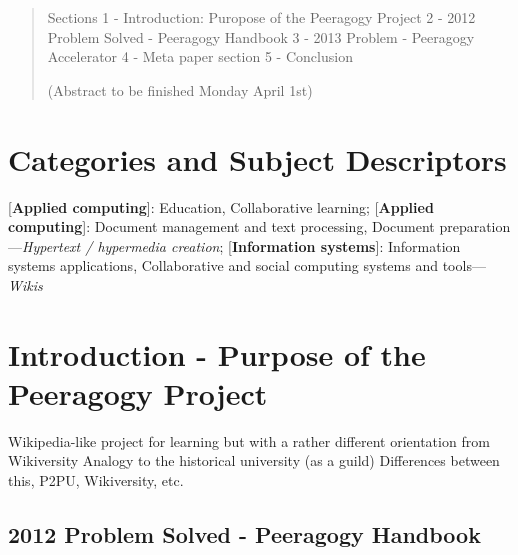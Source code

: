 \documentclass{acm_proc_article-sp}
\begin{document}

\maketitle
\begin{abstract}

Sections
1 - Introduction: Puropose of the Peeragogy Project
2 - 2012 Problem Solved - Peeragogy Handbook
3 - 2013 Problem - Peeragogy Accelerator
4 - Meta paper section
5 - Conclusion

(Abstract to be finished Monday April 1st)

\end{abstract}

%
%
%
%

\section*{Categories and Subject Descriptors}
[{\bf Applied computing}]: {Education}, {Collaborative learning};
[{\bf Applied computing}]: {Document management and text processing}, {Document preparation}---\emph{Hypertext / hypermedia creation};
[{\bf Information systems}]: {Information systems applications}, {Collaborative and social computing systems and tools}---\emph{Wikis}



%
%
%
%

\section{Introduction - Purpose of the Peeragogy Project}

Wikipedia-like project for learning
but with a rather different orientation from Wikiversity
Analogy to the historical university (as a guild)
Differences between this, P2PU, Wikiversity, etc.

\subsection{2012 Problem Solved - Peeragogy Handbook}
\end{document}

